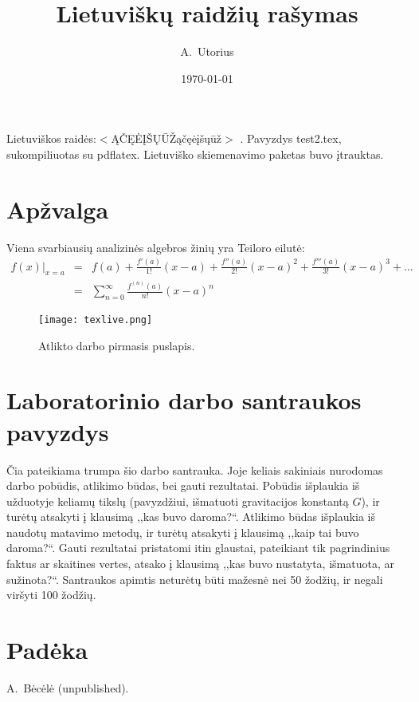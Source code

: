 \documentclass{article}
\begin{document}
\author{A.\ Utorius}
\title{Lietuvi{\v s}kų raid{\v z}ių ra{\v s}ymas}
\date{\today}

\maketitle

Lietuviškos raid{\.e}s:$<$ĄČĘĖĮŠŲŪŽąčęėįšųūž$>$ \cite{ref1}.
Pavyzdys {\sf test2.tex}, sukompiliuotas su \textsf{pdflatex}.
Lietuviško skiemenavimo paketas buvo įtrauktas.

\section{Apžvalga}

Viena svarbiausių analizinės algebros žinių yra Teiloro eilutė:
\begin{align}
f(x)\big|_{x=a} &=& f(a)
 + \frac{f'(a)}{1!} (x-a)
 + \frac{f''(a)}{2!} (x-a)^2
 + \frac{f'''(a)}{3!} (x-a)^3
 + \dots \nonumber \\
 &=& \sum\limits_{n=0}^{\infty} \frac{f^{(n)}(a)}{n!} (x-a)^n
\end{align}

\begin{figure}[b]
\texttt{[image: texlive.png]}
\caption{Atlikto darbo pirmasis puslapis.}
\label{fig-report}
\end{figure}

\section*{Laboratorinio darbo santraukos pavyzdys}

Čia pateikiama trumpa šio darbo santrauka. Joje keliais sakiniais
nurodomas darbo pobūdis, atlikimo būdas, bei gauti rezultatai. Pobūdis
išplaukia iš užduotyje keliamų tikslų (pavyzdžiui, išmatuoti
gravitacijos konstantą $G$), ir turėtų atsakyti į klausimą ,,kas buvo
daroma?{}``. Atlikimo būdas išplaukia iš naudotų matavimo metodų, ir
turėtų atsakyti į klausimą ,,kaip tai buvo daroma?{}``. Gauti
rezultatai pristatomi itin glaustai, pateikiant tik pagrindinius
faktus ar skaitines vertes, atsako į klausimą ,,kas buvo nustatyta,
išmatuota, ar sužinota?{}``. Santraukos apimtis neturėtų būti mažesnė
nei 50 žodžių, ir negali viršyti 100 žodžių.

\section*{Padėka}

\textit{}

\begin{thebibliography}{99}
 A.\ Bėcėlė (unpublished).
\end{thebibliography}
\end{document}
